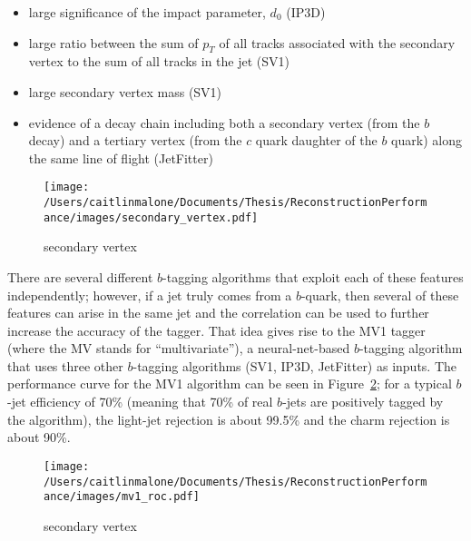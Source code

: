 \begin{itemize}
	\item large significance of the impact parameter, $d_0$ (IP3D)
	\item large ratio between the sum of $p_T$ of all tracks associated with the secondary vertex to the sum of all tracks in the jet (SV1)
	\item large secondary vertex mass (SV1)
	\item evidence of a decay chain including both a secondary vertex (from the $b$ decay) and a tertiary vertex (from the $c$ quark daughter of the $b$ quark) along the same line of flight (JetFitter)
\end{itemize}

\begin{figure}
	\texttt{[image: /Users/caitlinmalone/Documents/Thesis/ReconstructionPerformance/images/secondary\_vertex.pdf]}
	\caption{secondary vertex	\label{fig:secondary_vertex}  }
\end{figure}

There are several different $b$-tagging algorithms that exploit each of these features independently; however, if a jet truly comes from a $b$-quark, then several of these features can arise in the same jet and the correlation can be used to further increase the accuracy of the tagger.  That idea gives rise to the MV1 tagger (where the MV stands for ``multivariate''), a neural-net-based $b$-tagging algorithm that uses three other $b$-tagging algorithms (SV1, IP3D, JetFitter) as inputs.   The performance curve for the MV1 algorithm can be seen in Figure~\ref{fig:mv1_roc}; for a typical $b$-jet efficiency of 70\% (meaning that 70\% of real $b$-jets are positively tagged by the algorithm), the light-jet rejection is about 99.5\% and the charm rejection is about 90\%.


\begin{figure}
	\texttt{[image: /Users/caitlinmalone/Documents/Thesis/ReconstructionPerformance/images/mv1\_roc.pdf]}
	\caption{secondary vertex	\label{fig:mv1_roc}  }
\end{figure}
















